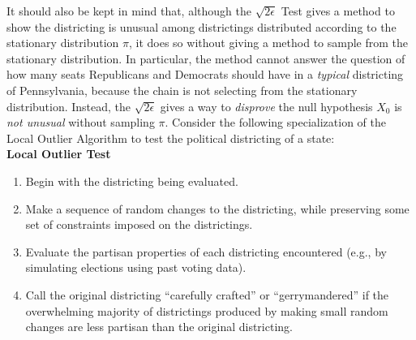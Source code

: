 \documentclass[12pt]{article}
\begin{document}
It should also be kept in mind that, although the \( \sqrt{2\epsilon} \)
Test gives a method to show the districting is unusual among
districtings distributed according to the stationary distribution \( \pi
\), it does so without giving a method to sample from the stationary
distribution.  In particular, the method cannot answer the question of
how many seats Republicans and Democrats should have in a \emph{typical}
districting of Pennsylvania, because the chain is not selecting from the
stationary distribution.  Instead, the \( \sqrt{2\epsilon} \) gives a
way to \emph{disprove} the null hypothesis \( X_{0} \) is \emph{not
unusual} without sampling \( \pi \). Consider the following
specialization of the Local Outlier Algorithm to test the political
districting of a state:\\
\textbf{Local Outlier Test}%
\begin{enumerate}
    \item
        Begin with the districting being evaluated.
    \item
        \label{enum:serialsignificance:mcstep} Make a sequence of random
        changes to the districting, while preserving some set of
        constraints imposed on the districtings.
    \item
        Evaluate the partisan properties of each districting encountered
        (e.g., by simulating elections using past voting data).
    \item
        \label{enum:serialsignificance:crafted} Call the original
        districting ``carefully crafted'' or ``gerrymandered'' if the
        overwhelming majority of districtings produced by making small
        random changes are less partisan than the original districting.
\end{enumerate}
\end{document}
